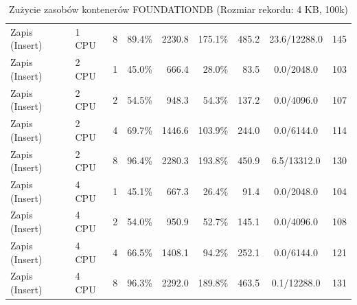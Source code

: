 \begin{table}[ht]
{\begin{tabular}{llcrrrrcc}
Zapis (Insert) & 1 CPU & 8 & 89.4\% & 2230.8 & 175.1\% & 485.2 & 23.6/12288.0 & 145 \\
Zapis (Insert) & 2 CPU & 1 & 45.0\% & 666.4 & 28.0\% & 83.5 & 0.0/2048.0 & 103 \\
Zapis (Insert) & 2 CPU & 2 & 54.5\% & 948.3 & 54.3\% & 137.2 & 0.0/4096.0 & 107 \\
Zapis (Insert) & 2 CPU & 4 & 69.7\% & 1446.6 & 103.9\% & 244.0 & 0.0/6144.0 & 114 \\
Zapis (Insert) & 2 CPU & 8 & 96.4\% & 2280.3 & 193.8\% & 450.9 & 6.5/13312.0 & 130 \\
Zapis (Insert) & 4 CPU & 1 & 45.1\% & 667.3 & 26.4\% & 91.4 & 0.0/2048.0 & 104 \\
Zapis (Insert) & 4 CPU & 2 & 54.0\% & 950.9 & 52.7\% & 145.1 & 0.0/4096.0 & 108 \\
Zapis (Insert) & 4 CPU & 4 & 66.5\% & 1408.1 & 94.2\% & 252.1 & 0.0/6144.0 & 121 \\
Zapis (Insert) & 4 CPU & 8 & 96.3\% & 2292.0 & 189.8\% & 463.5 & 0.1/12288.0 & 131 \\
\bottomrule
\end{tabular}%
}
\caption{Zużycie zasobów kontenerów FOUNDATIONDB (Rozmiar rekordu: 4 KB, 100k)}
\label{tab:resources_foundationdb_medium_100000}
\end{table}
